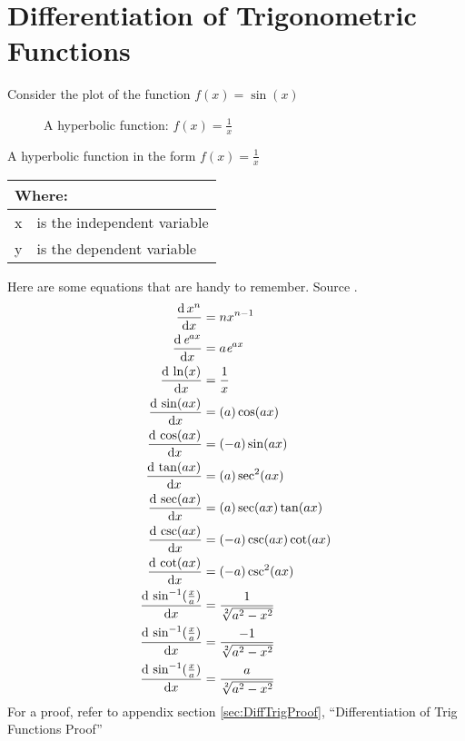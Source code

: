 \chapter{Differentiation of Trigonometric Functions}
\label{chap:DifferentiationOfTrigFunctions}
Consider the plot of the function $f(x) = \sin(x)$
\begin{figure}[!htb]
\label{fig:GraphTemplate}
\caption{A hyperbolic function: $f(x) = \frac{1}{x}$}
\end{figure}
A hyperbolic function in the form $ f(x) = \frac{1}{x}$
\begin{table}[!hbt]
\label{tab:GraphTemplateParts}
\begin{tabularx}{\linewidth}{| l X |}
  \hline
  \multicolumn{2}{|l|}{Where:} \\
  \hline \hline
  x & is the independent variable\\
  y & is the dependent variable\\
\hline
\end{tabularx}
\end{table}

Here are some equations that are handy to remember. Source \cite{RHBDiffQuickStart}.
\begin{align}
  \frac{\mathrm{d}\,x^n}{\mathrm{d}x}                & = n{x}^{n-1} \\
  \frac{\mathrm{d}\,{\emph{e}}^{ax}}{\mathrm{d}x} & = a{\emph{e}}^{ax} \\
  \frac{\mathrm{d}\,\ln(x)}{\mathrm{d}x}          & = \frac{1}{x} \\
  \frac{\mathrm{d}\,\sin(ax)}{\mathrm{d}x}        & = (a)\cos(ax) \\
  \frac{\mathrm{d}\,\cos(ax)}{\mathrm{d}x}        & = (-a)\sin(ax) \\
  \frac{\mathrm{d}\,\tan(ax)}{\mathrm{d}x}        & = (a)\sec^2(ax) \\
  \frac{\mathrm{d}\,\sec(ax)}{\mathrm{d}x}        & = (a)\sec(ax)\tan(ax) \\
  \frac{\mathrm{d}\,\csc(ax)}{\mathrm{d}x}        & = (-a)\csc(ax)\cot(ax) \\
  \frac{\mathrm{d}\,\cot(ax)}{\mathrm{d}x}        & = (-a)\csc^2(ax) \\
  \frac{\mathrm{d}\,\sin^{-1}(\frac{x}{a})}{\mathrm{d}x}
    & = \frac{1}{\sqrt[2]{{a}^{2} - {x}^{2}}} \\
  \frac{\mathrm{d}\,\sin^{-1}(\frac{x}{a})}{\mathrm{d}x}
    & = \frac{-1}{\sqrt[2]{{a}^{2} - {x}^{2}}} \\
  \frac{\mathrm{d}\,\sin^{-1}(\frac{x}{a})}{\mathrm{d}x}
    & = \frac{a}{\sqrt[2]{{a}^{2} - {x}^{2}}}
\end{align}
For a proof, refer to appendix section \ref{sec:DiffTrigProof},
``Differentiation of Trig Functions Proof''